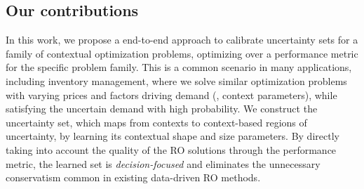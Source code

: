 \subsection{Our contributions}%
\label{c4:sub:our_contributions}
In this work, we propose a end-to-end approach to calibrate uncertainty sets for a family of contextual optimization problems, optimizing over a performance metric for the specific problem family.
This is a common scenario in many applications, including inventory management, where we solve similar optimization problems with varying prices and factors driving demand (\ie, context parameters), while satisfying the uncertain demand with high probability.
We construct the uncertainty set, which maps from contexts to context-based regions of uncertainty, by learning its contextual shape and size parameters.
By directly taking into account the quality of the \gls{RO} solutions through the performance metric,
the learned set is {\it decision-focused} and eliminates the unnecessary conservatism common in existing data-driven \gls{RO} methods. 
